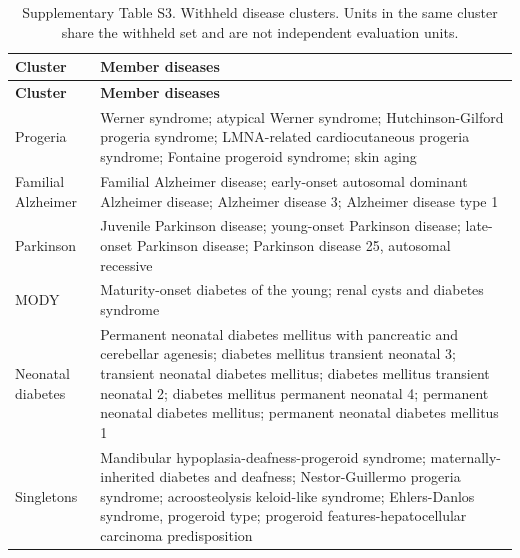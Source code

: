 \documentclass[11pt]{article}
\begin{document}
\begin{longtable}{@{}p{3.4cm} p{11.6cm}@{}}
\caption{Supplementary Table S3. Withheld disease clusters. Units in the same cluster share the withheld set and are not independent evaluation units.}\\
\toprule
\textbf{Cluster} & \textbf{Member diseases} \\
\midrule
\endfirsthead
\toprule
\textbf{Cluster} & \textbf{Member diseases} \\
\midrule
\endhead
Progeria & Werner syndrome; atypical Werner syndrome; Hutchinson-Gilford progeria syndrome; LMNA-related cardiocutaneous progeria syndrome; Fontaine progeroid syndrome; skin aging \\
Familial Alzheimer & Familial Alzheimer disease; early-onset autosomal dominant Alzheimer disease; Alzheimer disease 3; Alzheimer disease type 1 \\
Parkinson & Juvenile Parkinson disease; young-onset Parkinson disease; late-onset Parkinson disease; Parkinson disease 25, autosomal recessive \\
MODY & Maturity-onset diabetes of the young; renal cysts and diabetes syndrome \\
Neonatal diabetes & Permanent neonatal diabetes mellitus with pancreatic and cerebellar agenesis; diabetes mellitus transient neonatal 3; transient neonatal diabetes mellitus; diabetes mellitus transient neonatal 2; diabetes mellitus permanent neonatal 4; permanent neonatal diabetes mellitus; permanent neonatal diabetes mellitus 1 \\
Singletons & Mandibular hypoplasia-deafness-progeroid syndrome; maternally-inherited diabetes and deafness; Nestor-Guillermo progeria syndrome; acroosteolysis keloid-like syndrome; Ehlers-Danlos syndrome, progeroid type; progeroid features-hepatocellular carcinoma predisposition \\
\bottomrule
\end{longtable}
\end{document}

